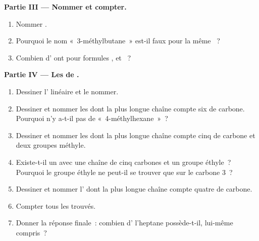 \begin{problem}
\medskip
\noindent\textbf{Partie III --- Nommer et compter.}
\begin{enumerate}[resume]
  \item Nommer .
  \item Pourquoi le nom «~3-méthylbutane~» est-il faux pour la même
        ~?
  \item Combien d'  ont pour formules ,
         et ~?
\end{enumerate}

\medskip
\noindent\textbf{Partie IV --- Les  de .}
\begin{enumerate}[resume]
  \item Dessiner l' linéaire et le nommer.
  \item Dessiner et nommer les  dont la plus longue chaîne compte
        six  de carbone. Pourquoi n'y a-t-il pas de
        «~4-méthylhexane~»~?
  \item Dessiner et nommer les  dont la plus longue chaîne compte
        cinq  de carbone et deux groupes méthyle.
  \item Existe-t-il un  avec une chaîne de cinq carbones et un
        groupe éthyle~? Pourquoi le groupe éthyle ne peut-il se trouver
        que sur le carbone 3~?
  \item Dessiner et nommer l' dont la plus longue chaîne compte
        quatre  de carbone.
  \item Compter tous les  trouvés.
  \item Donner la réponse finale~: combien d'
        l'heptane possède-t-il, lui-même compris~?
\end{enumerate}
\end{problem}
